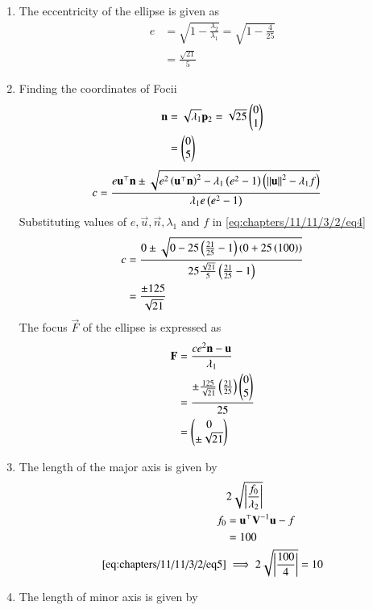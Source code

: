 \begin{enumerate}
\item The eccentricity of the ellipse is given as
\begin{align}
	e &= \sqrt{1 - \frac{\lambda_2}{\lambda_1}} = \sqrt{1-\frac{4}{25}}\\
	  &= \frac{\sqrt{21}}{5}
\end{align}
\item Finding the coordinates of Focii
\begin{align}
	\mathbf{n} &= \sqrt{\lambda_1}\mathbf{p}_2= \sqrt{25} \begin{pmatrix}0\\1\end{pmatrix}\\
	&= \begin{pmatrix}0\\5\end{pmatrix}
\end{align}
\begin{align}
	\label{eq:chapters/11/11/3/2/eq4}
	c &= \frac{e\mathbf{u}^\top \mathbf{n} \pm \sqrt{e^2 \left(\mathbf{u}^\top \mathbf{n}\right)^2-\lambda_1 \left(e^2 -1\right)\left(\left\lVert\mathbf{u}\right\rVert^2-\lambda_1 f\right)}}{\lambda_1 e\left(e^2-1\right)}
\end{align}
Substituting values of $e,\vec{u},\vec{n},\lambda_1 \text{ and } f$ in \eqref{eq:chapters/11/11/3/2/eq4}
\begin{align}
	c &= \frac{0 \pm \sqrt{0-25\left(\frac{21}{25}-1\right)\left(0+25\left(100\right)\right)}}{25\frac{\sqrt{21}}{5}\left(\frac{21}{25}-1\right)}\\
	&= \frac{\pm 125}{\sqrt{21}}
\end{align}
The focus $\vec{F}$ of the ellipse is expressed as
\begin{align}
	\mathbf{F} &= \frac{ce^2 \mathbf{n}-\mathbf{u}}{\lambda_1}\\
	&= \frac{\pm \frac{125}{\sqrt{21}}\left(\frac{21}{25}\right)\begin{pmatrix}0\\5\end{pmatrix}}{25}\\
	&= \begin{pmatrix}0\\\pm \sqrt{21}\end{pmatrix}
\end{align}
\item The length of the major axis is given by
\begin{align}
	\label{eq:chapters/11/11/3/2/eq5}
	&2\sqrt{\left\vert\frac{f_0}{\lambda_2}\right\vert}\\
	f_0 &= \mathbf{u}^\top \mathbf{V}^{-1} \mathbf{u} -f\\
	    &= 100\\
	\eqref{eq:chapters/11/11/3/2/eq5} &\implies 2\sqrt{\left\vert\frac{100}{4}\right\vert}
	 = 10
\end{align}
\item The length of minor axis is given by
\begin{align}

\end{align}
\end{enumerate}
